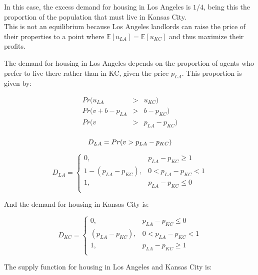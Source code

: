\begin{myanswerbox}
    In this case, the excess demand for housing in Los Angeles is \(1/4\), being this the proportion of the population that must live in Kansas City.\\

    This is not an equilibrium because Los Angeles landlords can raise the price of their properties to a point where \(\mathbb{E}[u_{LA}] = \mathbb{E}[u_{KC}]\) and thus maximize their profits.
\end{myanswerbox}

The demand for housing in Los Angeles depends on the proportion of agents who prefer to live there rather than in KC, given the price \( p_{LA} \). This proportion is given by:


\begin{eqnarray*}
    Pr(u_{LA} &>& u_{KC})\\
    Pr(v + b - p_{LA} &>& b - p_{KC})\\
    Pr(v &>& p_{LA} - p_{KC})\\
\end{eqnarray*}

\begin{equation}
    D_{LA} = Pr(v > p_{LA} - p_{KC})\\
\end{equation}

\begin{equation}
    D_{LA} = \begin{cases}
        0, &  p_{LA} - p_{KC} \geq 1\\
        1 - (p_{LA} - p_{KC}), & 0 < p_{LA} - p_{KC} < 1\\
        1, &  p_{LA} - p_{KC} \leq 0\\
    \end{cases}
\end{equation}

And the demand for housing in Kansas City is:

\begin{equation}
    D_{KC} = \begin{cases}
        0, &  p_{LA} - p_{KC} \leq 0\\
        (p_{LA} - p_{KC}), & 0 < p_{LA} - p_{KC} < 1\\
        1, &  p_{LA} - p_{KC} \geq 1\\
    \end{cases}
\end{equation}

The supply function for housing in Los Angeles and Kansas City is:

